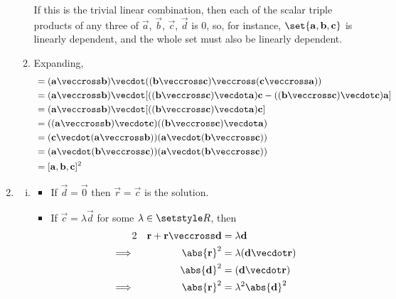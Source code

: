 \documentclass[fleqn,a4paper,11pt]{article}
\begin{document}
\begin{enumerate}
\begin{enumerate}
      If this is the trivial linear combination, then each of the scalar triple
      products of any three of \(\vec a\), \(\vec b\), \(\vec c\), \(\vec d\) is
      0, so, for instance, \(\set{\vec a, \vec b, \vec c}\) is linearly
      dependent, and the whole set must also be linearly dependent.
     \item Expanding,
      \begin{align*}
       [\vec a \veccross \vec b,
        \vec b \veccross \vec c,
        \vec c \veccross \vec a] &=
         (\vec a \veccross \vec b) \vecdot
         ((\vec b \veccross \vec c) \veccross (\vec c \veccross \vec a)) \\
        &= (\vec a \veccross \vec b)  \vecdot
           [((\vec b \veccross \vec c) \vecdot \vec a) \vec c
            - ((\vec b \veccross \vec c) \vecdot \vec c) \vec a] \\
        &= (\vec a \veccross \vec b) \vecdot
           [((\vec b \veccross \vec c) \vecdot \vec a) \vec c] \\
        &= ((\vec a \veccross \vec b) \vecdot \vec c)
           ((\vec b \veccross \vec c) \vecdot \vec a) \\
        &= (\vec c \vecdot (\vec a \veccross \vec b))
           (\vec a \vecdot (\vec b \veccross \vec c)) \\
        &= (\vec a \vecdot (\vec b \veccross \vec c))
           (\vec a \vecdot (\vec b \veccross \vec c)) \\
        &= [\vec a, \vec b, \vec c]^2
      \end{align*}
    \end{enumerate}
   \item
    \begin{enumerate}[(i)]
     \item
      \begin{itemize}
       \item
        If \(\vec d = \vec 0\) then \(\vec r = \vec c\) is the solution.
       \item
        If \(\vec c = \lambda \vec d\) for some \(\lambda \in \Reals\), then
        \begin{alignat*}2
         && \vec r + \vec r \veccross \vec d &= \lambda \vec d \\
         \implies{}&& \abs{\vec r}^2 &= \lambda(\vec d \vecdot \vec r) \\
         && \abs{\vec d}^2 &= (\vec d \vecdot \vec r) \\
         \implies{}&& \abs{\vec r}^2 &= \lambda^2\abs{\vec d}^2
        \end{alignat*}

\end{itemize}
\end{enumerate}
\end{enumerate}
\end{document}
